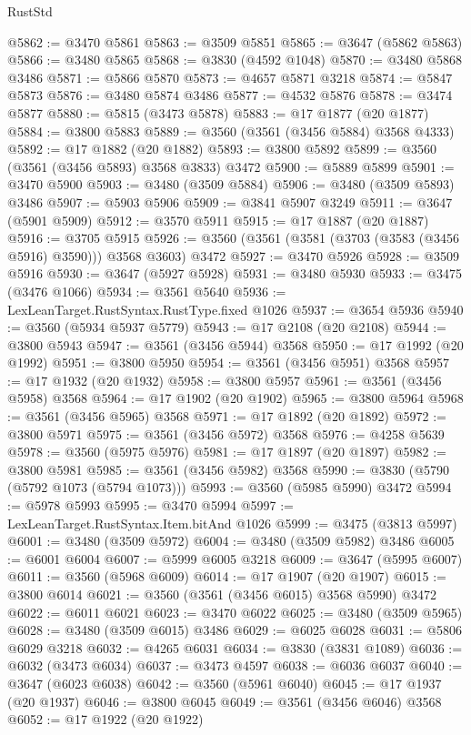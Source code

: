 \begin{lexlean}{RustStd}
\begin{coremodule}
@5862 := @3470 @5861
@5863 := @3509 @5851
@5865 := @3647 (@5862 @5863)
@5866 := @3480 @5865
@5868 := @3830 (@4592 @1048)
@5870 := @3480 @5868 @3486
@5871 := @5866 @5870
@5873 := @4657 @5871 @3218
@5874 := @5847 @5873
@5876 := @3480 @5874 @3486
@5877 := @4532 @5876
@5878 := @3474 @5877
@5880 := @5815 (@3473 @5878)
@5883 := @17 @1877 (@20 @1877)
@5884 := @3800 @5883
@5889 := @3560 (@3561 (@3456 @5884) @3568 @4333)
@5892 := @17 @1882 (@20 @1882)
@5893 := @3800 @5892
@5899 := @3560 (@3561 (@3456 @5893) @3568 @3833) @3472
@5900 := @5889 @5899
@5901 := @3470 @5900
@5903 := @3480 (@3509 @5884)
@5906 := @3480 (@3509 @5893) @3486
@5907 := @5903 @5906
@5909 := @3841 @5907 @3249
@5911 := @3647 (@5901 @5909)
@5912 := @3570 @5911
@5915 := @17 @1887 (@20 @1887)
@5916 := @3705 @5915
@5926 := @3560 (@3561 (@3581 (@3703 (@3583 (@3456 @5916) @3590))) @3568 @3603) @3472
@5927 := @3470 @5926
@5928 := @3509 @5916
@5930 := @3647 (@5927 @5928)
@5931 := @3480 @5930
@5933 := @3475 (@3476 @1066)
@5934 := @3561 @5640
@5936 := LexLeanTarget.RustSyntax.RustType.fixed @1026
@5937 := @3654 @5936
@5940 := @3560 (@5934 @5937 @5779)
@5943 := @17 @2108 (@20 @2108)
@5944 := @3800 @5943
@5947 := @3561 (@3456 @5944) @3568
@5950 := @17 @1992 (@20 @1992)
@5951 := @3800 @5950
@5954 := @3561 (@3456 @5951) @3568
@5957 := @17 @1932 (@20 @1932)
@5958 := @3800 @5957
@5961 := @3561 (@3456 @5958) @3568
@5964 := @17 @1902 (@20 @1902)
@5965 := @3800 @5964
@5968 := @3561 (@3456 @5965) @3568
@5971 := @17 @1892 (@20 @1892)
@5972 := @3800 @5971
@5975 := @3561 (@3456 @5972) @3568
@5976 := @4258 @5639
@5978 := @3560 (@5975 @5976)
@5981 := @17 @1897 (@20 @1897)
@5982 := @3800 @5981
@5985 := @3561 (@3456 @5982) @3568
@5990 := @3830 (@5790 (@5792 @1073 (@5794 @1073)))
@5993 := @3560 (@5985 @5990) @3472
@5994 := @5978 @5993
@5995 := @3470 @5994
@5997 := LexLeanTarget.RustSyntax.Item.bitAnd @1026
@5999 := @3475 (@3813 @5997)
@6001 := @3480 (@3509 @5972)
@6004 := @3480 (@3509 @5982) @3486
@6005 := @6001 @6004
@6007 := @5999 @6005 @3218
@6009 := @3647 (@5995 @6007)
@6011 := @3560 (@5968 @6009)
@6014 := @17 @1907 (@20 @1907)
@6015 := @3800 @6014
@6021 := @3560 (@3561 (@3456 @6015) @3568 @5990) @3472
@6022 := @6011 @6021
@6023 := @3470 @6022
@6025 := @3480 (@3509 @5965)
@6028 := @3480 (@3509 @6015) @3486
@6029 := @6025 @6028
@6031 := @5806 @6029 @3218
@6032 := @4265 @6031
@6034 := @3830 (@3831 @1089)
@6036 := @6032 (@3473 @6034)
@6037 := @3473 @4597
@6038 := @6036 @6037
@6040 := @3647 (@6023 @6038)
@6042 := @3560 (@5961 @6040)
@6045 := @17 @1937 (@20 @1937)
@6046 := @3800 @6045
@6049 := @3561 (@3456 @6046) @3568
@6052 := @17 @1922 (@20 @1922)

\end{coremodule}
\end{lexlean}
